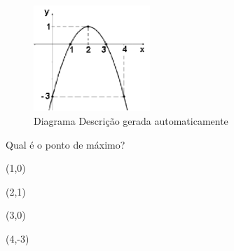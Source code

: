 \begin{escolha}
\begin{boxmedio}
\begin{boxmedio}
{\begin{boxpeq}
\begin{boxpeq}
{\begin{boxpeq}
\begin{boxmedio}
\begin{boxmedio}
\begin{boxpeq}
\begin{boxmedio}
\begin{boxpeq}
\begin{boxpeq}
\begin{boxpeq}
\begin{boxpeq}
\begin{boxmedio}
{\begin{boxmedio}
\begin{boxmedio}
\begin{boxpeq}
\begin{boxmedio}
\begin{boxpeq}
\begin{boxpeq}
\begin{boxpeq}
\begin{escolha}
{\begin{boxmedio}
\begin{boxpeq}
\begin{boxpeq}
\begin{boxpeq}
\begin{boxpeq}
\begin{boxpeq}
\begin{boxmedio}
\begin{boxpeq}
\begin{boxpeq}
\begin{boxpeq}
{\begin{boxpeq}
\begin{boxmedio}
\begin{boxpeq}
\begin{boxpeq}
\begin{boxpeq}
{\begin{boxpeq}
\begin{boxmedio}
{\begin{boxpeq}
\begin{boxpeq}
\begin{boxmedio}
\begin{boxmedio}
\begin{boxpeq}
\begin{boxpeq}
{\begin{boxpeq}
\begin{figure}
\centering
\includegraphics[width=1.72515in,height=1.5668in]{./_SAEB_9_MAT/media/image156.png}
\caption{Diagrama Descrição gerada automaticamente}
\end{figure}

Qual é o ponto de máximo?

\begin{escolha}

\item (1,0)

\item (2,1)

\item (3,0)

\item (4,-3)

\end{escolha}

\end{boxpeq}}
\end{boxpeq}
\end{boxpeq}
\end{boxmedio}
\end{boxmedio}
\end{boxpeq}
\end{boxpeq}}
\end{boxmedio}
\end{boxpeq}}
\end{boxpeq}
\end{boxpeq}
\end{boxpeq}
\end{boxmedio}
\end{boxpeq}}
\end{boxpeq}
\end{boxpeq}
\end{boxpeq}
\end{boxmedio}
\end{boxpeq}
\end{boxpeq}
\end{boxpeq}
\end{boxpeq}
\end{boxpeq}
\end{boxmedio}}
\end{escolha}
\end{boxpeq}
\end{boxpeq}
\end{boxpeq}
\end{boxmedio}
\end{boxpeq}
\end{boxmedio}
\end{boxmedio}}
\end{boxmedio}
\end{boxpeq}
\end{boxpeq}
\end{boxpeq}
\end{boxpeq}
\end{boxmedio}
\end{boxpeq}
\end{boxmedio}
\end{boxmedio}
\end{boxpeq}}
\end{boxpeq}
\end{boxpeq}}
\end{boxmedio}
\end{boxmedio}
\end{escolha}
